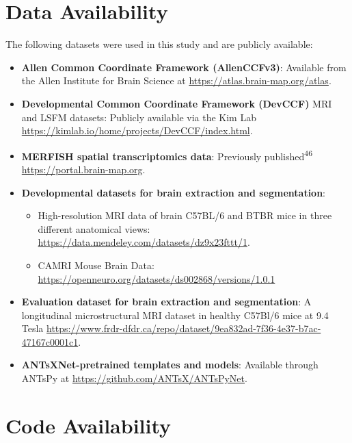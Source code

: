 \documentclass[
  12pt,
]{article}
\providecommand{\tightlist}{%
  \setlength{\itemsep}{0pt}\setlength{\parskip}{0pt}}
\begin{document}
\clearpage

\section*{Data Availability}\label{data-availability}

The following datasets were used in this study and are publicly
available:

\begin{itemize}
\tightlist
\item
  \textbf{Allen Common Coordinate Framework (AllenCCFv3)}: Available
  from the Allen Institute for Brain Science at
  \url{https://atlas.brain-map.org/atlas}.
\item
  \textbf{Developmental Common Coordinate Framework (DevCCF)} MRI and
  LSFM datasets: Publicly available via the Kim Lab
  \url{https://kimlab.io/home/projects/DevCCF/index.html}.
\item
  \textbf{MERFISH spatial transcriptomics data}: Previously
  published\textsuperscript{46} \url{https://portal.brain-map.org}.
\item
  \textbf{Developmental datasets for brain extraction and segmentation}:

  \begin{itemize}
  \tightlist
  \item
    High-resolution MRI data of brain C57BL/6 and BTBR mice in three
    different anatomical views:
    \url{https://data.mendeley.com/datasets/dz9x23fttt/1}.
  \item
    CAMRI Mouse Brain Data:
    \url{https://openneuro.org/datasets/ds002868/versions/1.0.1}
  \end{itemize}
\item
  \textbf{Evaluation dataset for brain extraction and segmentation}: A
  longitudinal microstructural MRI dataset in healthy C57Bl/6 mice at
  9.4 Tesla
  \url{https://www.frdr-dfdr.ca/repo/dataset/9ea832ad-7f36-4e37-b7ac-47167c0001c1}.
\item
  \textbf{ANTsXNet-pretrained templates and models}: Available through
  ANTsPy at
  \href{https://github.com/ANTsX/ANTsXNet}{https://github.com/ANTsX/ANTsPyNet}.
\end{itemize}

\clearpage

\section*{Code Availability}\label{code-availability}
\end{document}
